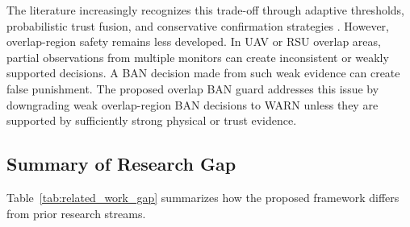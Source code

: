 \documentclass[journal]{IEEEtran}
\begin{document}
The literature increasingly recognizes this trade-off through adaptive thresholds, probabilistic trust fusion, and conservative confirmation strategies \cite{siddiqui2021SurveyTrustIoV,abidi2025CAMSI,liu2025QART}. However, overlap-region safety remains less developed. In UAV or RSU overlap areas, partial observations from multiple monitors can create inconsistent or weakly supported decisions. A BAN decision made from such weak evidence can create false punishment. The proposed overlap BAN guard addresses this issue by downgrading weak overlap-region BAN decisions to WARN unless they are supported by sufficiently strong physical or trust evidence.

\subsection{Summary of Research Gap}
\label{subsec:rw_gap}

Table~\ref{tab:related_work_gap} summarizes how the proposed framework differs from prior research streams.
\end{document}
